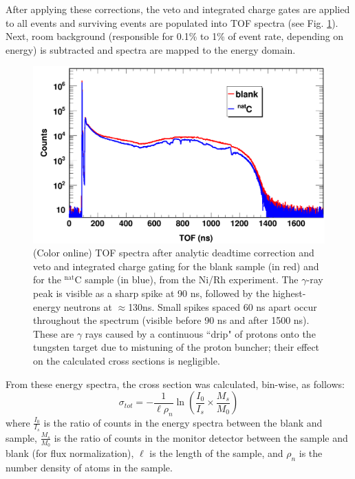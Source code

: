 \documentclass[twocolumn,secnumarabic,amssymb, nobibnotes, aps, prl,
superscriptaddress, nobalancelastpage]{revtex4}
\newcommand{\tot}{\ensuremath{\sigma_{tot}}}
\begin{document}
After applying these corrections, the veto and integrated charge gates are applied to 
all events and surviving events are populated into TOF spectra (see Fig.
\ref{ExampleTOFSpectrum}). Next, room background (responsible for 0.1\% to 1\% 
of event rate, depending on energy) is subtracted and spectra are mapped to the
energy domain.

\begin{figure}
    \includegraphics[scale=0.3]{figures/exampleTOFSpectrum.png}
    \caption{(Color online) TOF spectra after analytic deadtime correction and
        veto and integrated charge gating for the blank sample (in
        red) and for the $^{\text{nat}}$C sample (in blue), from the Ni/Rh experiment.
        The $\gamma$-ray peak is visible as a sharp spike at 90 ns, followed by
        the highest-energy neutrons at $\approx$130ns. Small spikes spaced 60 ns
        apart occur throughout the spectrum (visible before 90 ns and after 1500
        ns). These are $\gamma$ rays caused by a continuous ``drip" of protons onto the 
        tungsten target due to mistuning of the proton buncher; their
        effect on the calculated cross sections is negligible.
    }
    \label{ExampleTOFSpectrum}
\end{figure}

From these energy spectra, the cross section was calculated, bin-wise, as follows:
$$
\tot = -\frac{1}{\ell\rho_{n}}
\ln \left(\frac{I_{0}}{I_{s}}\times\frac{M_{s}}{M_{0}}\right)
$$
where $\frac{I_{0}}{I_{s}}$ is the ratio of counts in the energy spectra between 
the blank and sample, $\frac{M_{s}}{M_{0}}$ is the ratio of counts in the
monitor detector between the sample and blank (for flux normalization), $\ell$ is the length 
of the sample, and $\rho_{n}$ is the number density of atoms in the sample.
\end{document}
